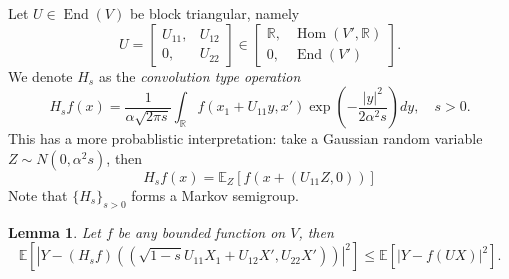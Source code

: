 \documentclass[a4paper]{article}
\newtheorem{lem}[thm]{Lemma}
\theoremstyle{definition}
\newcommand{\R}{\mathbb{R}}
\newcommand{\E}{\mathbb{E}}
\newcommand{\1}{\mathbbm{1}}
\DeclareMathOperator{\Hom}{Hom}
\DeclareMathOperator{\End}{End}
\begin{document}
	
	
	Let $U\in \End(V)$ be block triangular, namely
	\[
	U= \begin{bmatrix}
		U_{11}, & U_{12}\\
		0, & U_{22}
	\end{bmatrix} \in \begin{bmatrix}
		\R, & \Hom(V', \R) \\
		0, & \End(V')
	\end{bmatrix}.
	\]
	We denote $H_s$ as the \emph{convolution type operation} 
	\[
	H_sf(x)= \frac{1}{\alpha \sqrt{2\pi s}  } \int_{ \R } f(x_1+ U_{11} y, x' ) \exp( -\frac{|y|^2}{2\alpha^2 s}) dy,\quad s > 0.
	\]
	This has a more probablistic interpretation: take a Gaussian random variable $Z\sim N(0,\alpha^2s)$, then
	\[
	H_s f(x)= \E_Z[   f(x+ (U_{11} Z,0) )  ]
	\]
	Note that $\{H_s\}_{s > 0}$ forms a Markov semigroup.
	
	
	
	\begin{lem}\label{lem:convolution1}
		Let $f$ be any bounded function on $V$, then
		\[
		\E [| Y-(H_s f)( (\sqrt{1-s} U_{11}X_1 +U_{12} X', U_{22} X'))|^2] \leq \E[|Y-f(UX)|^2].
		\]
		
		
		
	\end{lem}
	
	
	
	
	
	
	
\end{document}
